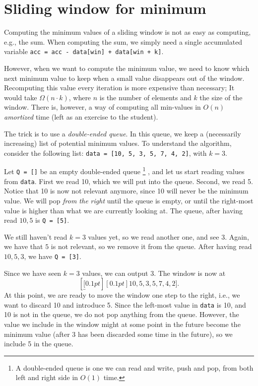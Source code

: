 \documentclass[a4paper,12pt]{article}
\newcommand{\window}[1]{\underbracket[0.1pt][0.1pt]{#1}}
\begin{document}
\section*{Sliding window for minimum}

Computing the minimum values of a sliding window is not as easy as computing,
e.g., the sum.  When computing the sum, we simply need a single accumulated
variable \texttt{acc = acc - data[win] + data[win + k]}.

However, when we want to compute the minimum value, we need to know which next
minimum value to keep when a small value disappears out of the window.
%
Recomputing this value every iteration is more expensive than necessary; It
would take $\Omega(n \cdot k)$, where $n$ is the number of elements and $k$ the size
of the window.  There is, however, a way of computing all min-values in $O(n)$ \emph{amortized}
time (left as an exercise to the student).

The trick is to use a \emph{double-ended queue}.  In this queue, we keep a
(necessarily increasing) list of potential minimum values.  To understand the
algorithm, consider the following list: \texttt{data = [10, 5, 3, 5, 7, 4, 2]}, with $k = 3$.

Let \texttt{Q = []} be an empty double-ended queue%
\footnote{A double-ended queue is one we can read and write, push and pop, from both left and right side in $O(1)$ time.}%
, and let us start reading values from \texttt{data}.
%
First we read 10, which we will put into the queue.  Second, we read 5.  Notice
that 10 is now not relevant anymore, since 10 will never be the minimum value.
We will pop \emph{from the right} until the queue is empty, or until the
right-most value is higher than what we are currently looking at.  The queue,
after having read $10, 5$ is \texttt{Q = [5]}.

We still haven't read $k=3$ values yet, so we read another one, and see 3.
Again, we have that $5$ is not relevant, so we remove it from the queue.  After
having read $10, 5, 3$, we have \texttt{Q = [3]}.

Since we have seen $k=3$ values, we can output $3$.  The window is now
at $$[\window{ 10, 5, 3}, 5, 7, 4, 2].$$ At this point, we are ready to
move the window one step to the right, i.e., we want to discard 10 and
introduce 5.  Since the left-most value in \texttt{data} is 10, and
10 is not in the queue, we do not pop anything from the queue.  However, the
value we include in the window might at some point in the future become the
minimum value (after 3 has been discarded some time in the future), so we
include 5 in the queue.
\end{document}
